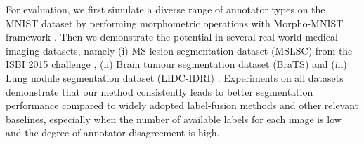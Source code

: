 

For evaluation, we first simulate a diverse range of annotator types on the MNIST dataset by performing morphometric operations with Morpho-MNIST framework \cite{castro2019morphomnist}. Then we demonstrate the potential in several real-world medical imaging datasets, namely (i) MS lesion segmentation dataset (MSLSC) from the ISBI 2015 challenge \cite{styner20083d}, (ii) Brain tumour segmentation dataset (BraTS) \cite{menze2014multimodal} and (iii) Lung nodule segmentation dataset (LIDC-IDRI) \cite{armato2011lung}. Experiments on all datasets demonstrate that our method consistently leads to better segmentation performance compared to widely adopted label-fusion methods and other relevant baselines, especially when the number of available labels for each image is low and the degree of annotator disagreement is high. 



